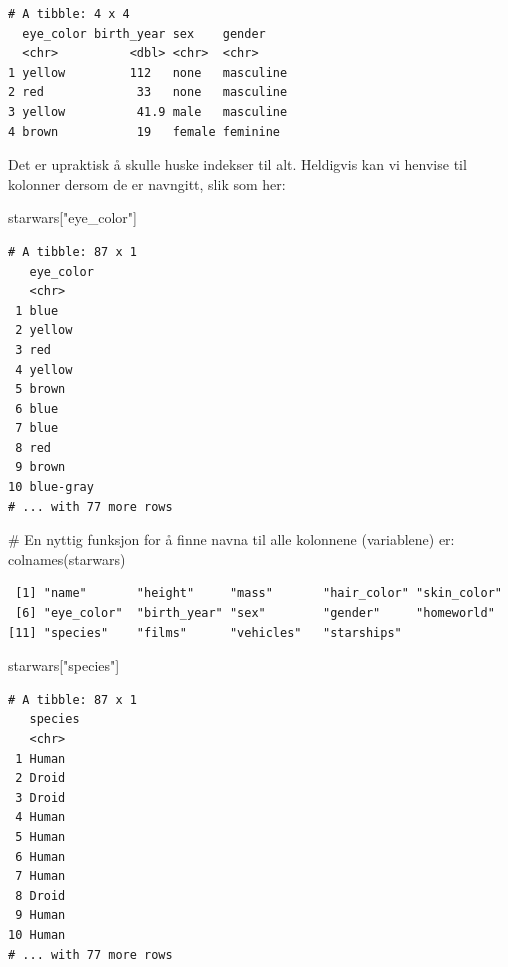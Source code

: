 \documentclass[
  letterpaper,
  DIV=11,
  numbers=noendperiod]{scrartcl}
\newenvironment{Shaded}{\begin{snugshade}}{\end{snugshade}}
\newcommand{\CommentTok}[1]{\textcolor[rgb]{0.37,0.37,0.37}{#1}}
\newcommand{\FunctionTok}[1]{\textcolor[rgb]{0.28,0.35,0.67}{#1}}
\newcommand{\NormalTok}[1]{\textcolor[rgb]{0.00,0.23,0.31}{#1}}
\newcommand{\StringTok}[1]{\textcolor[rgb]{0.13,0.47,0.30}{#1}}
\begin{document}
\begin{verbatim}
# A tibble: 4 x 4
  eye_color birth_year sex    gender   
  <chr>          <dbl> <chr>  <chr>    
1 yellow         112   none   masculine
2 red             33   none   masculine
3 yellow          41.9 male   masculine
4 brown           19   female feminine 
\end{verbatim}

Det er upraktisk å skulle huske indekser til alt. Heldigvis kan vi
henvise til kolonner dersom de er navngitt, slik som her:

\begin{Shaded}
\begin{Highlighting}[]
\NormalTok{starwars[}\StringTok{"eye\_color"}\NormalTok{]}
\end{Highlighting}
\end{Shaded}

\begin{verbatim}
# A tibble: 87 x 1
   eye_color
   <chr>    
 1 blue     
 2 yellow   
 3 red      
 4 yellow   
 5 brown    
 6 blue     
 7 blue     
 8 red      
 9 brown    
10 blue-gray
# ... with 77 more rows
\end{verbatim}

\begin{Shaded}
\begin{Highlighting}[]
\CommentTok{\# En nyttig funksjon for å finne navna til alle kolonnene (variablene) er:}
\FunctionTok{colnames}\NormalTok{(starwars)}
\end{Highlighting}
\end{Shaded}

\begin{verbatim}
 [1] "name"       "height"     "mass"       "hair_color" "skin_color"
 [6] "eye_color"  "birth_year" "sex"        "gender"     "homeworld" 
[11] "species"    "films"      "vehicles"   "starships" 
\end{verbatim}

\begin{Shaded}
\begin{Highlighting}[]
\NormalTok{starwars[}\StringTok{"species"}\NormalTok{]}
\end{Highlighting}
\end{Shaded}

\begin{verbatim}
# A tibble: 87 x 1
   species
   <chr>  
 1 Human  
 2 Droid  
 3 Droid  
 4 Human  
 5 Human  
 6 Human  
 7 Human  
 8 Droid  
 9 Human  
10 Human  
# ... with 77 more rows
\end{verbatim}
\end{document}
